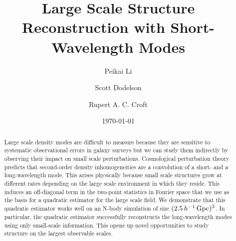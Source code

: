 \documentclass[prd,amsmath,amssymb,floatfix,superscriptaddress,nofootinbib,twocolumn]{revtex4-1}
\begin{document}
\title{Large Scale Structure Reconstruction with Short-Wavelength Modes}
\author{\large Peikai Li}
\author{\large Scott Dodelson}
\author{\large Rupert A. C. Croft}

\date{\today}
\begin{abstract}
\noindent Large scale density modes are difficult to measure because they are sensitive to systematic observational errors in galaxy surveys but we can study them indirectly by observing their impact on small scale perturbations. Cosmological perturbation theory predicts that second-order density inhomogeneities are a convolution of a short- and a long-wavelength mode. This arises physically because small scale structures grow at different rates depending on the large scale environment in which they reside. This induces an off-diagonal term in the two-point statistics in Fourier space that we use as the basis for a quadratic estimator for the large scale field. We demonstrate that this quadratic estimator works well on an N-body simulation of size  $(2.5\,h^{-1}\,\rm Gpc)^3$. In particular, the quadratic estimator successfully reconstructs the long-wavelength modes using only small-scale information. This opens up novel opportunities to study structure on the largest observable scales. 

\end{abstract}
\maketitle
{}
\end{document}
